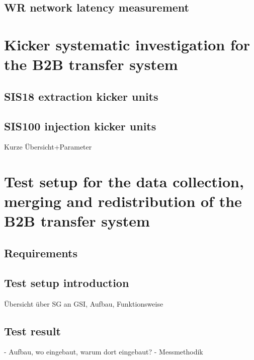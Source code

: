 \subsection{WR network latency measurement}

\section{Kicker systematic investigation for the B2B transfer system}
\subsection{SIS18 extraction kicker units}
\subsection{SIS100 injection kicker units}
Kurze Übersicht+Parameter

\section{Test setup for the data collection, merging and redistribution of the B2B transfer system}
\subsection{Requirements}
\subsection{Test setup introduction}
Übersicht über SG an GSI, Aufbau, Funktionsweise
\subsection{Test result}
- Aufbau, wo eingebaut, warum dort eingebaut?
- Messmethodik

